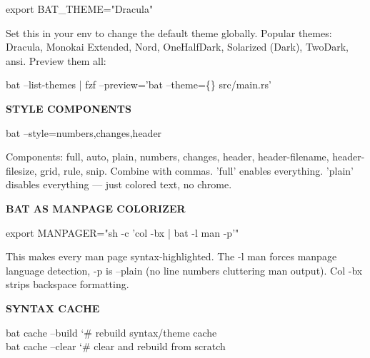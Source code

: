 \documentclass[11pt,a4paper,twoside]{book}
\begin{document}
\begin{codebox}
\color{neongreen}export BAT\_THEME="Dracula"\\
\end{codebox}

Set this in your env to change the default theme globally. Popular themes: Dracula, Monokai Extended, Nord, OneHalfDark, Solarized (Dark), TwoDark, ansi. Preview them all:

\begin{codebox}
\color{neongreen}bat --list-themes | fzf --preview='bat --theme=\{\} src/main.rs'\\
\end{codebox}


\vspace{12pt}
{\bfseries\color{neonyellow} STYLE COMPONENTS}\vspace{4pt}

\begin{codebox}
\color{neongreen}bat --style=numbers,changes,header\\
\end{codebox}

Components: full, auto, plain, numbers, changes, header, header-filename, header-filesize, grid, rule, snip. Combine with commas. 'full' enables everything. 'plain' disables everything — just colored text, no chrome.


\vspace{12pt}
{\bfseries\color{neonyellow} BAT AS MANPAGE COLORIZER}\vspace{4pt}

\begin{codebox}
\color{neongreen}export MANPAGER="sh -c 'col -bx | bat -l man -p'"\\
\end{codebox}

This makes every man page syntax-highlighted. The -l man forces manpage language detection, -p is --plain (no line numbers cluttering man output). Col -bx strips backspace formatting.


\vspace{12pt}
{\bfseries\color{neonyellow} SYNTAX CACHE}\vspace{4pt}

\begin{codebox}
\color{neongreen}bat cache --build    {\char`\#} rebuild syntax/theme cache\\
\color{neongreen}bat cache --clear    {\char`\#} clear and rebuild from scratch\\
\end{codebox}
\end{document}
